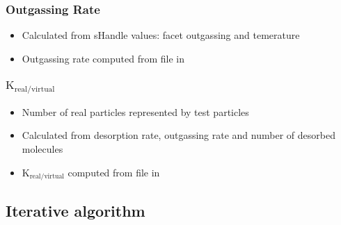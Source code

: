 \subsubsection{Outgassing Rate}
\begin{itemize}[noitemsep,topsep=0pt]
\item Calculated from sHandle values: facet outgassing and temerature
\item Outgassing rate computed from  file in 
\end{itemize}

\subsubsection{$\text{K}_{\text{real}/\text{virtual}}$}
\begin{itemize}[noitemsep,topsep=0pt]
\item Number of real particles represented by test particles
\item Calculated from desorption rate, outgassing rate and number of desorbed molecules
\item $\text{K}_{\text{real}/\text{virtual}}$ computed from  file in 
\end{itemize}

\newpage
\subsection{Iterative algorithm}
